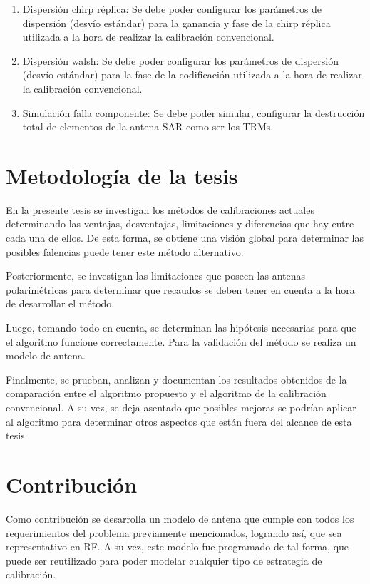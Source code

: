 \begin{enumerate}
    \item Dispersión chirp réplica: Se debe poder configurar los parámetros de dispersión (desvío estándar) para la
		ganancia y fase de la chirp réplica utilizada a la hora de realizar la calibración convencional.

    \item Dispersión walsh: Se debe poder configurar los parámetros de dispersión (desvío estándar) para la fase de la
		codificación utilizada a la hora de realizar la calibración convencional.

    \item Simulación falla componente: Se debe poder simular, configurar la destrucción total de elementos de la antena SAR
		como ser los TRMs.
\end{enumerate}


\section{Metodología de la tesis} \label{sc:methodology}
En la presente tesis se investigan los métodos de calibraciones actuales determinando las ventajas, desventajas,
limitaciones y diferencias que hay entre cada una de ellos. De esta forma, se obtiene una visión global para
determinar las posibles falencias puede tener este método alternativo.

Posteriormente, se investigan las limitaciones que poseen las antenas polarimétricas para determinar que recaudos
se deben tener en cuenta a la hora de desarrollar el método.

Luego, tomando todo en cuenta, se determinan las hipótesis necesarias para que el algoritmo funcione correctamente. Para
la validación del método se realiza un modelo de antena.

Finalmente, se prueban, analizan y documentan los resultados obtenidos de la comparación entre el algoritmo propuesto
y el algoritmo de la calibración convencional. A su vez, se deja asentado que posibles mejoras se podrían aplicar al
algoritmo para determinar otros aspectos que están fuera del alcance de esta tesis.

\section{Contribución} \label{sc:contribution}

Como contribución se desarrolla un modelo de antena que cumple con todos los requerimientos del problema previamente
mencionados, logrando así, que sea representativo en RF. A su vez, este modelo fue programado de tal forma, que puede
ser reutilizado para poder modelar cualquier tipo de estrategia de calibración.

